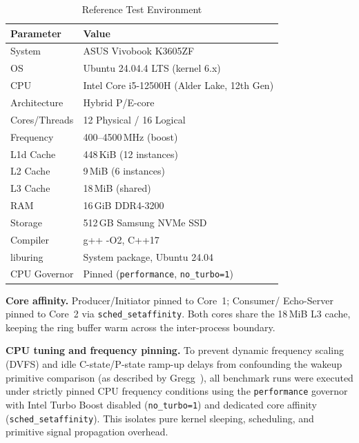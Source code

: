 \documentclass[10pt,conference]{IEEEtran}
\begin{document}
\begin{table}[H]
  \centering
  \caption{Reference Test Environment}
  \label{tab:env}
  \small
  \begin{tabular}{@{}L{3.0cm}L{4.8cm}@{}}
    \toprule
    \textbf{Parameter} & \textbf{Value}\\
    \midrule
    System          & ASUS Vivobook K3605ZF \\
    OS              & Ubuntu 24.04.4 LTS (kernel 6.x) \\
    CPU             & Intel Core i5-12500H (Alder Lake, 12th Gen) \\
    Architecture    & Hybrid P/E-core \\
    Cores/Threads   & 12 Physical / 16 Logical \\
    Frequency       & 400--4500\,MHz (boost) \\
    L1d Cache       & 448\,KiB (12 instances) \\
    L2 Cache        & 9\,MiB (6 instances) \\
    L3 Cache        & 18\,MiB (shared) \\
    RAM             & 16\,GiB DDR4-3200 \\
    Storage         & 512\,GB Samsung NVMe SSD \\
    Compiler        & g++ -O2, C++17 \\
    liburing        & System package, Ubuntu 24.04 \\
    CPU Governor    & Pinned (\texttt{performance}, \texttt{no\_turbo=1}) \\
    \bottomrule
  \end{tabular}
\end{table}

\textbf{Core affinity.}  Producer/Initiator pinned to Core~1; Consumer/
Echo-Server pinned to Core~2 via \texttt{sched\_setaffinity}.  Both cores
share the 18\,MiB L3 cache, keeping the ring buffer warm across the
inter-process boundary.

\textbf{CPU tuning and frequency pinning.}  To prevent dynamic frequency scaling (DVFS)
and idle C-state/P-state ramp-up delays from confounding the wakeup primitive
comparison (as described by Gregg~\cite{gregg2020}), all benchmark runs were
executed under strictly pinned CPU frequency conditions using the \texttt{performance}
governor with Intel Turbo Boost disabled (\texttt{no\_turbo=1}) and dedicated core affinity
(\texttt{sched\_setaffinity}).  This isolates pure kernel sleeping, scheduling, and
primitive signal propagation overhead.
\end{document}

